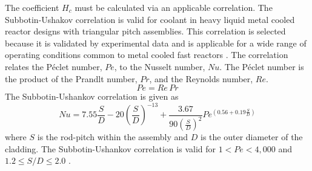       The coefficient $H_c$ must be calculated via an applicable correlation.
      The Subbotin-Ushakov correlation is valid for coolant in heavy liquid
      metal cooled reactor designs with triangular pitch assemblies. This
      correlation is selected because it is validated by experimental data and
      is applicable for a wide range of operating conditions common to metal
      cooled fast reactors \cite{subbotinUshakov}. The correlation relates the
      P\'eclet number, $Pe$, to the Nusselt number, $Nu$. The P\'eclet number is
      the product of the Prandlt number, $Pr$, and the Reynolds number, $Re$.
      \begin{equation}
        \label{eq:peclet}
        Pe = Re \, Pr
      \end{equation}
      The Subbotin-Ushankov correlation is given as
      \begin{equation}
        \label{eq:subbotinUshakov}
        Nu = 7.55 \frac{S}{D} - 20 \left(\frac{S}{D}\right)^{-13} + 
          \frac{3.67}{90\left(\frac{S}{D}\right)^{2}}
          Pe^{\left(0.56 + 0.19 \frac{S}{D}\right)}
      \end{equation}
      where $S$ is the rod-pitch within the assembly and $D$ is the outer 
      diameter of the cladding. The Subbotin-Ushankov correlation is valid for
      ${ 1 < Pe < 4,000 }$ and ${1.2 \le S/D \le 2.0}$ \cite{subbotinUshakov}.


